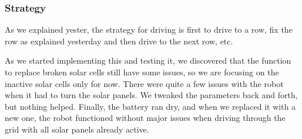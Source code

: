 \subsubsection{Strategy}

As we explained yester, the strategy for driving is first to drive to a
row, fix the row as explained yesterday and then drive to the next row,
etc.

As we started implementing this and testing it, we discovered that the
function to replace broken solar cells still have some issues, so we are
focusing on the inactive solar cells only for now. There were quite a
few issues with the robot when it had to turn the solar panels. We
tweaked the parameters back and forth, but nothing helped. Finally, the
battery ran dry, and when we replaced it with a new one, the robot
functioned without major issues when driving through the grid with all
solar panels already active.

